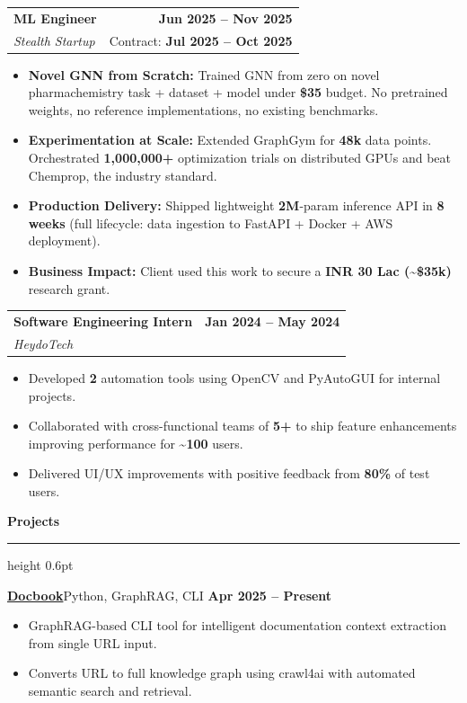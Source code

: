 \documentclass[10pt,letterpaper]{article}
\makeatletter
\newcommand{\sectiontitle}[1]{%
  \vspace{1pt}
  {\normalsize\bfseries\color{accent} #1}\par
  \vspace{0.5pt}
  {\color{accent}\hrule height 0.6pt}
  \vspace{1pt}
}
\newcommand{\entry}[4]{%
  \begin{tabularx}{\textwidth}{@{}X r@{}}
    {\bfseries #1} & {\footnotesize\bfseries #2} \\
    {\footnotesize\textit{#3}} & {\footnotesize #4}
  \end{tabularx}
  \vspace{0pt}
}
\newcommand{\projectentry}[2]{%
  {\bfseries #1}\hfill{\footnotesize #2}\par
  \vspace{0.5pt}
}
\newenvironment{tightitems}{%
  \begin{itemize}
    \setlength{\itemsep}{0pt}
    \setlength{\parskip}{0pt}
    \setlength{\parsep}{0pt}
    \setlength{\topsep}{0pt}
    \setlength{\leftmargin}{10pt}
    \setlength{\itemindent}{0pt}
}{%
  \end{itemize}
  \vspace{-2.5pt}
}
\makeatother
\begin{document}
\entry{ML Engineer}{\textbf{Jun 2025 -- Nov 2025}}{Stealth Startup}{Contract: \textbf{Jul 2025 -- Oct 2025}}
\vspace{-3pt}
\begin{tightitems}
  \item \textbf{Novel GNN from Scratch:} Trained GNN from zero on novel pharmachemistry task + dataset + model under \textbf{\$35} budget. No pretrained weights, no reference implementations, no existing benchmarks.
  \item \textbf{Experimentation at Scale:} Extended GraphGym for \textbf{48k} data points. Orchestrated \textbf{1,000,000+} optimization trials on distributed GPUs and beat Chemprop, the industry standard.
  \item \textbf{Production Delivery:} Shipped lightweight \textbf{2M}-param inference API in \textbf{8 weeks} (full lifecycle: data ingestion to FastAPI + Docker + AWS deployment).
  \item \textbf{Business Impact:} Client used this work to secure a \textbf{INR 30 Lac (\textasciitilde\$35k)} research grant.
\end{tightitems}
\vspace{-3.5pt}

\entry{Software Engineering Intern}{\textbf{Jan 2024 -- May 2024}}{HeydoTech}{}
\vspace{-3pt}
\begin{tightitems}
  \item Developed \textbf{2} automation tools using OpenCV and PyAutoGUI for internal projects.
  \item Collaborated with cross-functional teams of \textbf{5+} to ship feature enhancements improving performance for \textbf{\textasciitilde{}100} users.
  \item Delivered UI/UX improvements with positive feedback from \textbf{80\%} of test users.
\end{tightitems}
\vspace{-2pt}

\sectiontitle{Projects}

\projectentry{\href{https://github.com/Saarthakkj/docbook}{Docbook}}{Python, GraphRAG, CLI \textbar{} \textbf{Apr 2025 -- Present}}
\vspace{-3pt}
\begin{tightitems}
  \item GraphRAG-based CLI tool for intelligent documentation context extraction from single URL input.
  \item Converts URL to full knowledge graph using crawl4ai with automated semantic search and retrieval.
\end{tightitems}
\end{document}
